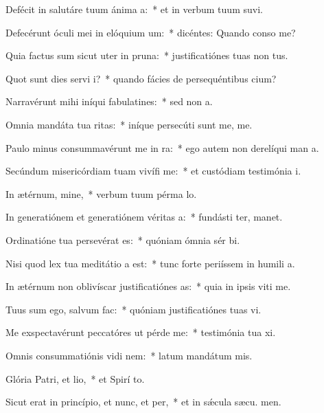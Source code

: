 \item Defécit in salutáre tuum ánima a:~* et in verbum tuum suvi.
\item Defecérunt óculi mei in elóquium um:~* dicéntes: Quando conso me?
\item Quia factus sum sicut uter in pruna:~* justificatiónes tuas non  tus.
\item Quot sunt dies servi i?~* quando fácies de persequéntibus  cium?
\item Narravérunt mihi iníqui fabulatines:~* sed non   a.
\item Omnia mandáta tua ritas:~* iníque persecúti sunt me,  me.
\item Paulo minus consummavérunt me in ra:~* ego autem non derelíqui man a.
\item Secúndum misericórdiam tuam vivífi me:~* et custódiam testimónia  i.
\item In ætérnum, mine,~* verbum tuum pérma  lo.
\item In generatiónem et generatiónem véritas a:~* fundásti ter,  manet.
\item Ordinatióne tua persevérat es:~* quóniam ómnia sér bi.
\item Nisi quod lex tua meditátio a est:~* tunc forte periíssem in humili a.
\item In ætérnum non oblivíscar justificatiónes as:~* quia in ipsis viti me.
\item Tuus sum ego, salvum  fac:~* quóniam justificatiónes tuas vi.
\item Me exspectavérunt peccatóres ut pérde me:~* testimónia tua xi.
\item Omnis consummatiónis vidi nem:~* latum mandátum  mis.
\item Glória Patri, et lio,~* et Spirí to.
\item Sicut erat in princípio, et nunc, et per,~* et in sǽcula sæcu. men.
